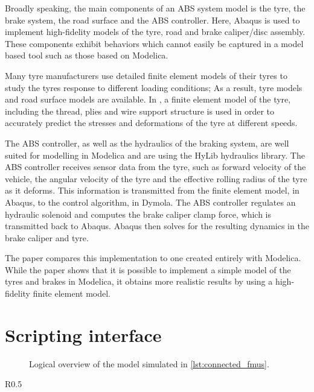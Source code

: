 \documentclass[\rootfolder/main.tex]{subfiles}
\begin{document}
Broadly speaking, the main components of an ABS system model is the tyre, the brake system, the road surface and the ABS controller.
Here, Abaqus is used to implement high-fidelity models of the tyre, road and brake caliper/disc assembly.
These components exhibit behaviors which cannot easily be captured in a model based tool such as those based on Modelica.

Many tyre manufacturers use detailed finite element models of their tyres to study the tyres response to different loading conditions;
As a result, tyre models and road surface models are available.
In \cite{Schofield}, a finite element model of the tyre, including the thread, plies and wire support structure is used in order to accurately predict the stresses and deformations of the tyre at different speeds.

The ABS controller, as well as the hydraulics of the braking system, are well suited for modelling in Modelica and are using the HyLib hydraulics library.
The ABS controller receives sensor data from the tyre, such as forward velocity of the vehicle, the angular velocity of the tyre and the effective rolling radius of the tyre as it deforms.
This information is transmitted from the finite element model, in Abaqus, to the control algorithm, in Dymola.
The ABS controller regulates an hydraulic solenoid and computes the brake caliper clamp force, which is transmitted back to Abaqus.
Abaqus then solves for the resulting dynamics in the brake caliper and tyre.

The paper compares this implementation to one created entirely with Modelica.
While the paper shows that it is possible to implement a simple model of the tyres and brakes in Modelica, it obtains more realistic results by using a high-fidelity finite element model.

\section{Scripting interface}

\begin{figure}[H]
    \caption{Logical overview of the model simulated in \cref{lst:connected_fmus}.\label{fig:fmi-connected}}
\end{figure}

\begin{wraptable}{R}{0.5\columnwidth}
    \inputminted[firstline=3, lastline=30]{Python}{\rootfolder/Chapters/Chapter2/Listings/simulate.py}
\end{wraptable}
\end{document}
